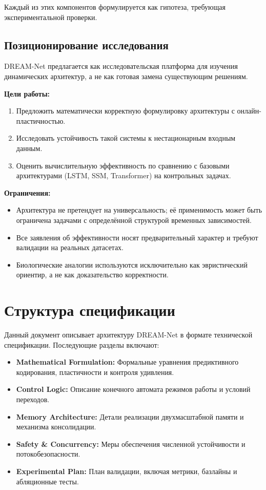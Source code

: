 Каждый из этих компонентов формулируется как гипотеза, требующая экспериментальной проверки.

\subsection{Позиционирование исследования}

DREAM-Net предлагается как исследовательская платформа для изучения динамических архитектур, а не как готовая замена существующим решениям.

\textbf{Цели работы:}
\begin{enumerate}
    \item Предложить математически корректную формулировку архитектуры с онлайн-пластичностью.
    \item Исследовать устойчивость такой системы к нестационарным входным данным.
    \item Оценить вычислительную эффективность по сравнению с базовыми архитектурами (LSTM, SSM, Transformer) на контрольных задачах.
\end{enumerate}

\textbf{Ограничения:}
\begin{itemize}
    \item Архитектура не претендует на универсальность; её применимость может быть ограничена задачами с определённой структурой временных зависимостей.
    \item Все заявления об эффективности носят предварительный характер и требуют валидации на реальных датасетах.
    \item Биологические аналогии используются исключительно как эвристический ориентир, а не как доказательство корректности.
\end{itemize}

\section{Структура спецификации}

Данный документ описывает архитектуру DREAM-Net в формате технической спецификации. Последующие разделы включают:

\begin{itemize}
    \item \textbf{Mathematical Formulation:} Формальные уравнения предиктивного кодирования, пластичности и контроля удивления.
    \item \textbf{Control Logic:} Описание конечного автомата режимов работы и условий переходов.
    \item \textbf{Memory Architecture:} Детали реализации двухмасштабной памяти и механизма консолидации.
    \item \textbf{Safety \& Concurrency:} Меры обеспечения численной устойчивости и потокобезопасности.
    \item \textbf{Experimental Plan:} План валидации, включая метрики, базлайны и абляционные тесты.
\end{itemize}

